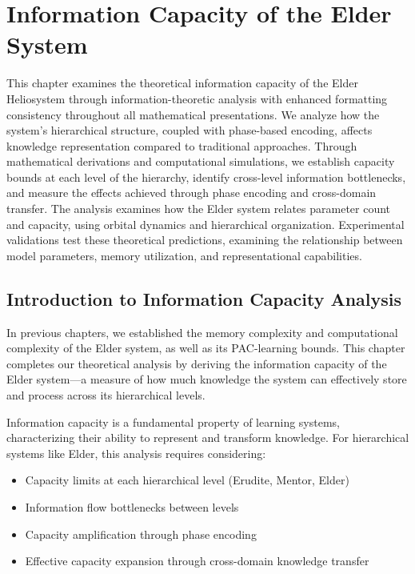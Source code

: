 \chapter{Information Capacity of the Elder System}

\begin{tcolorbox}[colback=blue!5!white,colframe=blue!75!black,title=Chapter Summary]
This chapter examines the theoretical information capacity of the Elder Heliosystem through information-theoretic analysis with enhanced formatting consistency throughout all mathematical presentations. We analyze how the system's hierarchical structure, coupled with phase-based encoding, affects knowledge representation compared to traditional approaches. Through mathematical derivations and computational simulations, we establish capacity bounds at each level of the hierarchy, identify cross-level information bottlenecks, and measure the effects achieved through phase encoding and cross-domain transfer. The analysis examines how the Elder system relates parameter count and capacity, using orbital dynamics and hierarchical organization. Experimental validations test these theoretical predictions, examining the relationship between model parameters, memory utilization, and representational capabilities.
\end{tcolorbox}

\section{Introduction to Information Capacity Analysis}

In previous chapters, we established the memory complexity and computational complexity of the Elder system, as well as its PAC-learning bounds. This chapter completes our theoretical analysis by deriving the information capacity of the Elder system—a measure of how much knowledge the system can effectively store and process across its hierarchical levels.

Information capacity is a fundamental property of learning systems, characterizing their ability to represent and transform knowledge. For hierarchical systems like Elder, this analysis requires considering:

\begin{itemize}
    \item Capacity limits at each hierarchical level (Erudite, Mentor, Elder)
    \item Information flow bottlenecks between levels
    \item Capacity amplification through phase encoding
    \item Effective capacity expansion through cross-domain knowledge transfer
\end{itemize}


